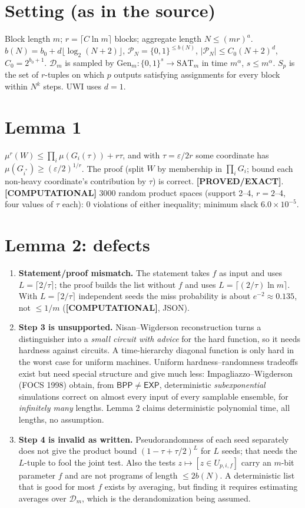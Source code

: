 \documentclass[11pt]{article}
\theoremstyle{remark}
\newcommand{\D}{\mathcal{D}}
\newcommand{\PN}{\mathcal{P}_N}
\newcommand{\status}[1]{\textbf{[#1]}}
\begin{document}
\section{Setting (as in the source)}

Block length $m$; $r=\lceil C\ln m\rceil$ blocks; aggregate length $N\le (mr)^a$.
$b(N)=b_0+d\lfloor\log_2(N+2)\rfloor$, $\PN=\{0,1\}^{\le b(N)}$, $|\PN|\le C_0(N+2)^d$, $C_0=2^{b_0+1}$.
$\D_m$ is sampled by $\mathrm{Gen}_m:\{0,1\}^s\to\mathrm{SAT}_m$ in time $m^\alpha$, $s\le m^\alpha$.
$S_p$ is the set of $r$-tuples on which $p$ outputs satisfying assignments for every block within $N^k$
steps. UWI uses $d=1$.

\section{Lemma 1}

$\mu^r(W)\le\prod_i\mu(G_i(\tau))+r\tau$, and with $\tau=\varepsilon/2r$ some coordinate has
$\mu(G_{i^*})\ge(\varepsilon/2)^{1/r}$. The proof (split $W$ by membership in $\prod_iG_i$; bound each
non-heavy coordinate's contribution by $\tau$) is correct. \status{PROVED/EXACT}.
\status{COMPUTATIONAL} 3000 random product spaces (support 2--4, $r=2$--4, four values of $\tau$ each):
0 violations of either inequality; minimum slack $6.0\times10^{-5}$.

\section{Lemma 2: defects}

\begin{enumerate}
\item \textbf{Statement/proof mismatch.} The statement takes $f$ as input and uses $L=\lceil 2/\tau\rceil$;
the proof builds the list without $f$ and uses $L=\lceil(2/\tau)\ln m\rceil$. With $L=\lceil 2/\tau\rceil$
independent seeds the miss probability is about $e^{-2}\approx0.135$, not $\le 1/m$
(\status{COMPUTATIONAL}, JSON).
\item \textbf{Step 3 is unsupported.} Nisan--Wigderson reconstruction turns a distinguisher into a
\emph{small circuit with advice} for the hard function, so it needs hardness against circuits.
A time-hierarchy diagonal function is only hard in the worst case for uniform machines. Uniform
hardness--randomness tradeoffs exist but need special structure and give much less:
Impagliazzo--Wigderson (FOCS 1998) obtain, from $\mathsf{BPP}\neq\mathsf{EXP}$, deterministic
\emph{subexponential} simulations correct on almost every input of every samplable ensemble, for
\emph{infinitely many} lengths. Lemma 2 claims deterministic polynomial time, all lengths, no assumption.
\item \textbf{Step 4 is invalid as written.} Pseudorandomness of each seed separately does not give the
product bound $(1-\tau+\tau/2)^L$ for $L$ seeds; that needs the $L$-tuple to fool the joint test.
Also the tests $z\mapsto[z\in U_{p,i,f}]$ carry an $m$-bit parameter $f$ and are not programs of length
$\le 2b(N)$. A deterministic list that is good for most $f$ exists by averaging, but finding it requires
estimating averages over $\D_m$, which is the derandomization being assumed.
\end{enumerate}
\end{document}
